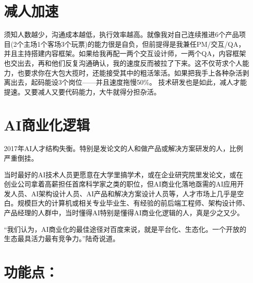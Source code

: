 \documentclass[letterpaper,10pt,english]{sphinxmanual}
\begin{document}
\chapter{减人加速}
\label{\detokenize{index:id7}}
须知人数越少，沟通成本越低，执行效率越高。就像我对自己连续推进6个产品项目(2个主场1个客场3个玩票)的能力很是自负，但前提得是我兼任PM/交互/QA，并且主持搭建内容框架。如果给我再配一两个交互设计师，一两个QA，内容框架也交出去，再和他们反复沟通确认，我的速度反而被拉了下来。这不仅苛求个人能力，也要求你在大包大揽时，还能接受其中的粗活笨活。如果把我手上各种杂活剥离出去，起码能设3个岗位——并且速度拖慢50\%。
技术研发也是如此，减人才能提速。又要减人又要代码能力，大牛就得分担杂活。%
\begin{footnote}[17]\sphinxAtStartFootnote
{}
%
\end{footnote}


\chapter{AI商业化逻辑}
\label{\detokenize{index:id8}}
2017年AI人才结构失衡。特别是发论文的人和做产品或解决方案研发的人，比例严重倒挂。
%
\begin{footnote}[18]\sphinxAtStartFootnote
{}
%
\end{footnote}

当时最好的AI技术人员更愿意在大学里搞学术，或在企业研究院里发论文，或在创业公司拿着高薪担任首席科学家之类的职位，但AI商业化落地亟需的AI应用开发人员、AI架构设计人员、AI产品和解决方案设计人员等，人才市场上几乎是空白。规模巨大的计算机或相关专业毕业生、有经验的前后端工程师、架构设计师、产品经理的人群中，当时懂得AI特别是懂得AI商业化逻辑的人，真是少之又少。

“我们认为，AI商业化的最佳途径对百度来说，就是平台化、生态化。一个开放的生态最具活力最有竞争力。”陆奇说道。%
\begin{footnote}[19]\sphinxAtStartFootnote
{}
%
\end{footnote}


\chapter{功能点：}
\label{\detokenize{index:id9}}
\end{document}
